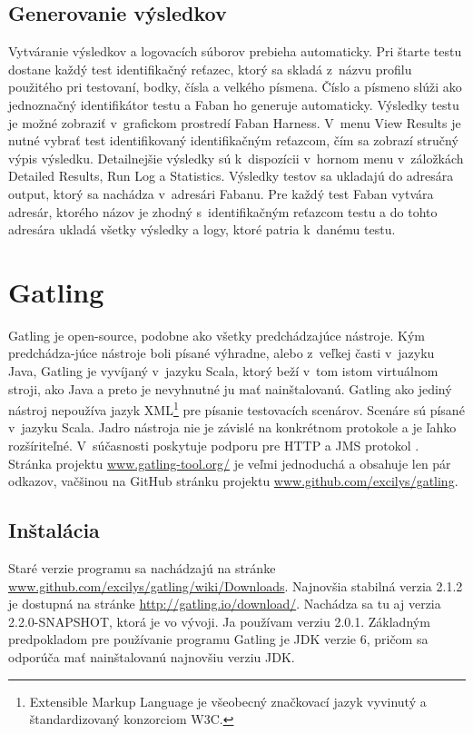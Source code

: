 \documentclass[12pt,oneside,final]{fithesis-utf8}
\begin{document}
\subsection{Generovanie výsledkov}
Vytváranie výsledkov a logovacích súborov prebieha automaticky. Pri štarte testu dostane každý test identifikačný reťazec, ktorý sa skladá z~názvu profilu použitého pri testovaní, bodky, čísla a velkého písmena. Číslo a písmeno slúži ako jednoznačný identifikátor testu a Faban ho generuje automaticky. Výsledky testu je možné zobraziť v~grafickom prostredí Faban Harness. V~menu View Results je nutné vybrať test identifikovaný identifikačným reťazcom, čím sa zobrazí stručný výpis výsledku. Detailnejšie výsledky sú k~dispozícii v~hornom menu v~záložkách Detailed Results, Run Log a Statistics. Výsledky testov sa ukladajú do adresára output, ktorý sa nachádza v~adresári Fabanu. Pre každý test Faban vytvára adresár, ktorého názov je zhodný s~identifikačným reťazcom testu a do tohto adresára ukladá všetky výsledky a logy, ktoré patria k~danému testu.

\newpage
\section{Gatling}
Gatling je open-source, podobne ako všetky predchádzajúce nástroje. Kým predchádza-júce nástroje boli písané výhradne, alebo z~veľkej časti v~jazyku Java, Gatling je vyvíjaný v~jazyku Scala, ktorý beží v~tom istom virtuálnom stroji, ako Java a preto je nevyhnutné ju mať nainštalovanú. Gatling ako jediný nástroj nepoužíva jazyk XML\footnote{Extensible Markup Language je všeobecný značkovací jazyk vyvinutý a štandardizovaný konzorciom W3C.} pre písanie testovacích scenárov. Scenáre sú písané v~jazyku Scala. Jadro nástroja nie je závislé na konkrétnom protokole a je ľahko rozšíriteľné. V~súčasnosti poskytuje podporu pre HTTP a JMS protokol \cite{Gatling}. Stránka projektu \url{www.gatling-tool.org/} je veľmi jednoduchá a obsahuje len pár odkazov, vačšinou na GitHub stránku projektu \url{www.github.com/excilys/gatling}.

\subsection{Inštalácia}
Staré verzie programu sa nachádzajú na stránke \url{www.github.com/excilys/gatling/wiki/Downloads}. Najnovšia stabilná verzia 2.1.2 je dostupná na stránke \url{http://gatling.io/download/}. Nachádza sa tu aj verzia 2.2.0-SNAPSHOT, ktorá je vo vývoji. Ja používam verziu 2.0.1. Základným predpokladom pre používanie programu Gatling je JDK verzie 6, pričom sa odporúča mať nainštalovanú najnovšiu verziu JDK.
\end{document}
